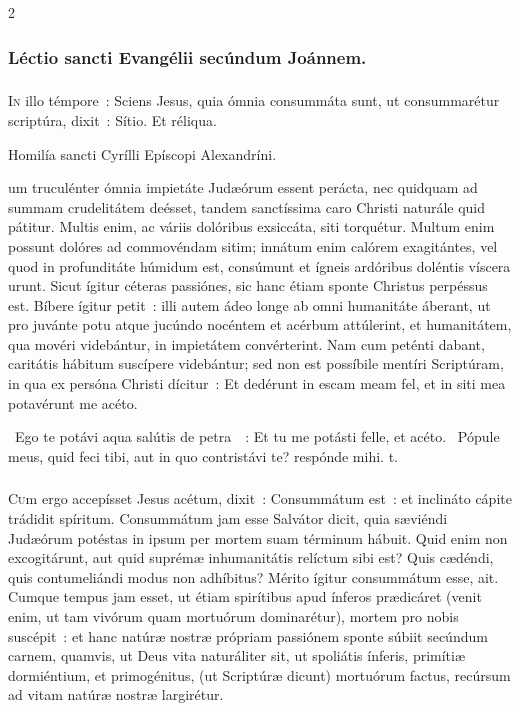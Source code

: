 \documentclass[9pt,twoside]{extarticle}
\begin{document}
\begin{multicols}{2}
{{\subsubsection*{\center Léctio sancti Evangélii secúndum Joánnem.}
\subsubsection*{\center {}}
\lettrine{I}n illo témpore~: Sciens Jesus, quia ómnia consummáta sunt, ut consummarétur scriptúra, dixit~: Sítio. Et réliqua.

\begin{center}Homilía sancti Cyrílli Epíscopi Alexandríni.\\
\end{center}
um truculénter ómnia impietáte Judæórum essent perácta, nec quidquam ad summam crudelitátem deésset, tandem sanctíssima caro Christi naturále quid pátitur. Multis enim, ac váriis dolóribus exsiccáta, siti torquétur. Multum enim possunt dolóres ad commovéndam sitim; innátum enim calórem exagitántes, vel quod in profunditáte húmidum est, consúmunt et ígneis ardóribus doléntis víscera urunt. Sicut ígitur céteras passiónes, sic hanc étiam sponte Christus perpéssus est. Bíbere ígitur petit~: illi autem ádeo longe ab omni humanitáte áberant, ut pro juvánte potu atque jucúndo nocéntem et acérbum attúlerint, et humanitátem, qua movéri videbántur, in impietátem convérterint. Nam cum peténti dabant, caritátis hábitum suscípere videbántur; sed non est possíbile mentíri Scriptúram, in qua ex persóna Christi dícitur~: Et dedérunt in escam meam fel, et in siti mea potavérunt me acéto.

\begin{tightlist}{}
\item {}~Ego te potávi aqua salútis de petra~~: \textred{*} Et tu me potásti felle, et acéto. ~Pópule meus, quid feci tibi, aut in quo contristávi te? respónde mihi. t.
\end{tightlist}

\subsubsection*{\center{}}
\lettrine{C}um ergo accepísset Jesus acétum, dixit~: Consummátum est~: et inclináto cápite trádidit spíritum. Consummátum jam esse Salvátor dicit, quia sæviéndi Judæórum potéstas in ipsum per mortem suam términum hábuit. Quid enim non excogitárunt, aut quid suprémæ inhumanitátis relíctum sibi est? Quis cædéndi, quis contumeliándi modus non adhíbitus? Mérito ígitur consummátum esse, ait. Cumque tempus jam esset, ut étiam spirítibus apud ínferos prædicáret (venit enim, ut tam vivórum quam mortuórum dominarétur), mortem pro nobis suscépit~: et hanc natúræ nostræ própriam passiónem sponte súbiit secúndum carnem, quamvis, ut Deus vita naturáliter sit, ut spoliátis ínferis, primítiæ dormiéntium, et primogénitus, (ut Scriptúræ dicunt) mortuórum factus, recúrsum ad vitam natúræ nostræ largirétur.

}}
\end{multicols}
\end{document}
